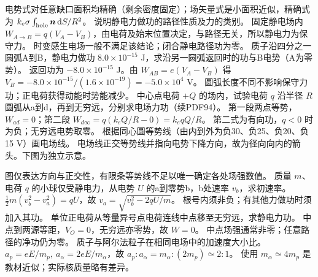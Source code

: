 \crosscheck 电势式对任意缺口面积均精确（剩余密度固定）；场矢量式是小面积近似，精确式为 $k_e\sigma\int_{\rm hole}\bm n\,\mathrm dS/R^2$。
\problemtext 说明静电力做功的路径性质及力的类别。
\workings 固定静电场内 $W_{A\to B}=q(V_A-V_B)$，由电荷及始末位置决定，与路径无关，所以静电力为保守力。
\crosscheck 时变感生电场一般不满足该结论；闭合静电路径功为零。
\problemtext 质子沿四分之一圆弧A到B，静电力做功 $8.0\times10^{-15}$ J，求沿另一圆弧返回时的功与B电势（A为零势）。
\workings 返回功为 $-8.0\times10^{-15}$ J。由 $W_{AB}=e(V_A-V_B)$ 得 $V_B=-8.0\times10^{-15}/(1.6\times10^{-19})=-5.0\times10^4$ V。
\crosscheck 圆弧长度不同不影响保守力功；正电荷获得动能时势能减少。
\problemtext 中心点电荷 $+Q$ 的场内，试验电荷 $q$ 沿半径 $R$ 圆弧从a到d，再到无穷远，分别求电场力功（续PDF94）。
\workings 第一段两点等势，$W_{ad}=0$；第二段 $W_{d\infty}=q(k_eQ/R-0)=k_eqQ/R$。
\crosscheck 第二式为有向功，$q<0$ 时为负；无穷远电势取零。
\problemtext 根据同心圆等势线（由内到外为负30、负25、负20、负15 V）画电场线。
\workings 电场线正交等势线并指向电势下降方向，故为径向向内的箭头。下图为独立示意。
\begin{center}
\end{center}
\crosscheck 图仅表达方向与正交性，有限条等势线不足以唯一确定各处场强数值。
\problemtext 质量 $m$、电荷 $q$ 的小球仅受静电力，从电势 $U$ 的a到零势b，b处速率 $v_b$，求初速率。
\workings $\tfrac12m(v_b^2-v_a^2)=qU$，故 $v_a=\sqrt{v_b^2-2qU/m}$。
\crosscheck 根号内须非负；有其他力做功时须加入其功。
\problemtext 单位正电荷从等量异号点电荷连线中点移至无穷远，求静电力功。
\workings 中点到两源等距，$V_O=0$，无穷远亦零势，故 $W=0$。
\crosscheck 中点场强通常非零；任意路径的净功仍为零。
\problemtext 质子与阿尔法粒子在相同电场中的加速度大小比。
\workings $a_p=eE/m_p,\ a_\alpha=2eE/m_\alpha$，故 $a_p:a_\alpha=m_\alpha:(2m_p)\simeq2:1$。
\crosscheck 使用 $m_\alpha\simeq4m_p$ 是教材近似；实际核质量略有差异。
